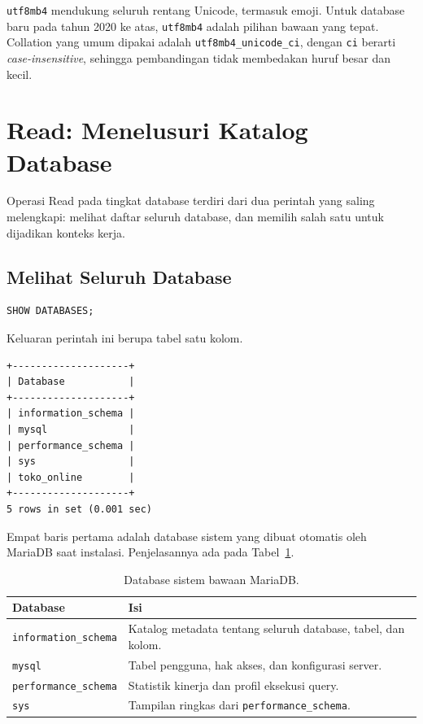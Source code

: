 \documentclass[11pt,a4paper]{article}
\begin{document}
\texttt{utf8mb4} mendukung seluruh rentang Unicode, termasuk emoji. Untuk database baru pada tahun 2020 ke atas, \texttt{utf8mb4} adalah pilihan bawaan yang tepat. Collation yang umum dipakai adalah \texttt{utf8mb4\_unicode\_ci}, dengan \texttt{ci} berarti \textit{case-insensitive}, sehingga pembandingan tidak membedakan huruf besar dan kecil.

\section{Read: Menelusuri Katalog Database}

Operasi Read pada tingkat database terdiri dari dua perintah yang saling melengkapi: melihat daftar seluruh database, dan memilih salah satu untuk dijadikan konteks kerja.

\subsection{Melihat Seluruh Database}

\begin{lstlisting}[style=code]
SHOW DATABASES;
\end{lstlisting}

Keluaran perintah ini berupa tabel satu kolom.

\begin{lstlisting}[style=out]
+--------------------+
| Database           |
+--------------------+
| information_schema |
| mysql              |
| performance_schema |
| sys                |
| toko_online        |
+--------------------+
5 rows in set (0.001 sec)
\end{lstlisting}

Empat baris pertama adalah database sistem yang dibuat otomatis oleh MariaDB saat instalasi. Penjelasannya ada pada Tabel~\ref{tab:sys-db}.

\begin{table}[H]
	\centering
	\caption{Database sistem bawaan MariaDB.}
	\label{tab:sys-db}
	\small
	\begin{tabularx}{\textwidth}{l X}
		\toprule
		Database                     & Isi                                                          \\
		\midrule
		\texttt{information\_schema} & Katalog metadata tentang seluruh database, tabel, dan kolom. \\
		\texttt{mysql}               & Tabel pengguna, hak akses, dan konfigurasi server.           \\
		\texttt{performance\_schema} & Statistik kinerja dan profil eksekusi query.                 \\
		\texttt{sys}                 & Tampilan ringkas dari \texttt{performance\_schema}.          \\
		\bottomrule
	\end{tabularx}
\end{table}
\end{document}
